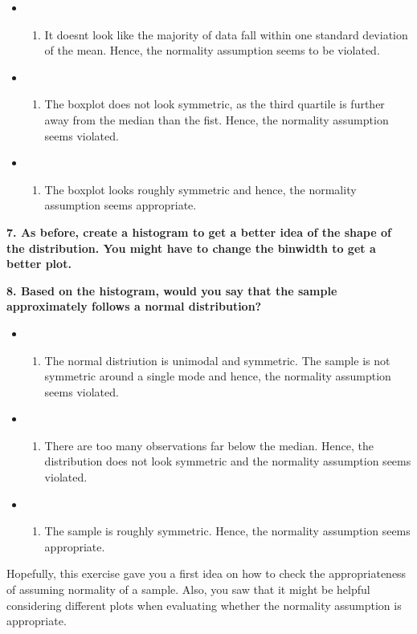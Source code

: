 \documentclass[
]{book}
\providecommand{\tightlist}{%
  \setlength{\itemsep}{0pt}\setlength{\parskip}{0pt}}
\begin{document}
\begin{itemize}
\item
  \begin{enumerate}
  \def\labelenumi{(\Alph{enumi})}
  \tightlist
  \item
    It doesn\textquotesingle t look like the majority of data fall within one standard deviation of the mean. Hence, the normality assumption seems to be violated.\\
  \end{enumerate}
\item
  \begin{enumerate}
  \def\labelenumi{(\Alph{enumi})}
  \setcounter{enumi}{1}
  \tightlist
  \item
    The boxplot does not look symmetric, as the third quartile is further away from the median than the fist. Hence, the normality assumption seems violated.\\
  \end{enumerate}
\item
  \begin{enumerate}
  \def\labelenumi{(\Alph{enumi})}
  \setcounter{enumi}{2}
  \tightlist
  \item
    The boxplot looks roughly symmetric and hence, the normality assumption seems appropriate.
  \end{enumerate}
\end{itemize}

\textbf{7. As before, create a histogram to get a better idea of the shape of the distribution. You might have to change the binwidth to get a better plot.}

\textbf{8. Based on the histogram, would you say that the sample approximately follows a normal distribution?}

\begin{itemize}
\item
  \begin{enumerate}
  \def\labelenumi{(\Alph{enumi})}
  \tightlist
  \item
    The normal distriution is unimodal and symmetric. The sample is not symmetric around a single mode and hence, the normality assumption seems violated.\\
  \end{enumerate}
\item
  \begin{enumerate}
  \def\labelenumi{(\Alph{enumi})}
  \setcounter{enumi}{1}
  \tightlist
  \item
    There are too many observations far below the median. Hence, the distribution does not look symmetric and the normality assumption seems violated.\\
  \end{enumerate}
\item
  \begin{enumerate}
  \def\labelenumi{(\Alph{enumi})}
  \setcounter{enumi}{2}
  \tightlist
  \item
    The sample is roughly symmetric. Hence, the normality assumption seems appropriate.
  \end{enumerate}
\end{itemize}

Hopefully, this exercise gave you a first idea on how to check the appropriateness of assuming normality of a sample. Also, you saw that it might be helpful considering different plots when evaluating whether the normality assumption is appropriate.
\end{document}
